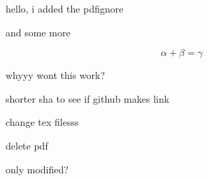 \documentclass{article}
\begin{document}
hello, i added the pdfignore

and some more

$$\alpha + \beta = \gamma$$


whyyy wont this work?

shorter sha to see if github makes link

change tex filesss

delete pdf

only modified?
\end{document}
